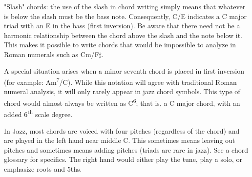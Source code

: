 \documentclass{article}
\begin{document}
\normalsize

"Slash" chords: the use of the slash in chord writing simply means that whatever is below the slash must be the bass note. Consequently, C/E indicates a C major triad with an E in the bass (first inversion). Be aware that there need not be a harmonic relationship between the chord above the slash and the note below it. This makes it possible to write chords that would be impossible to analyze in Roman numerals such as Cm/F$\sharp$.

A special situation arises when a minor seventh chord is placed in first inversion (for example: Am\textsuperscript{7}/C). While this notation will agree with traditional Roman numeral analysis, it will only rarely appear in jazz chord symbols. This type of chord would almost always be written as C\textsuperscript{6}; that is, a C major chord, with an added 6\textsuperscript{th} scale degree.

In Jazz, most chords are voiced with four pitches (regardless of the chord) and are played in the left hand near middle C. This sometimes means leaving out pitches and sometimes means adding pitches (triads are rare in jazz). See a chord glossary for specifics. The right hand would either play the tune, play a solo, or emphasize roots and 5ths.
\end{document}
